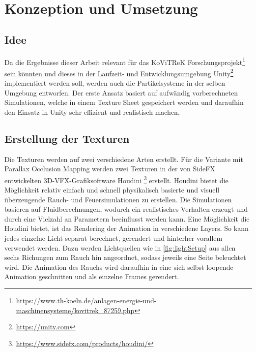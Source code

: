 \section{Konzeption und Umsetzung}
\label{sec:4}
\subsection{Idee}

Da die Ergebnisse dieser Arbeit relevant für das KoViTReK Forschungsprojekt\footnote{\url{https://www.th-koeln.de/anlagen-energie-und-maschinensysteme/kovitrek\_87259.php}}
sein könnten und dieses in der Laufzeit- und Entwicklungsumgebung Unity\footnote{\url{https://unity.com}}
implementiert werden soll, werden auch die Partikelsysteme in der selben Umgebung entworfen.
Der erste Ansatz basiert auf aufwändig vorberechneten Simulationen, welche in einem Texture Sheet gespeichert werden und daraufhin den Einsatz in Unity
sehr effizient und realistisch machen. 


\subsection{Erstellung der Texturen}
\label{sec:4.1}


Die Texturen werden auf zwei verschiedene Arten erstellt. Für die Variante mit Parallax Occlusion Mapping werden zwei
Texturen in der von SideFX entwickelten 3D-VFX-Grafiksoftware Houdini \footnote{\url{https://www.sidefx.com/products/houdini/}} erstellt. 
Houdini bietet die Möglichkeit relativ einfach und schnell physikalisch basierte und visuell überzeugende Rauch- und Feuersimulationen zu erstellen. 
Die Simulationen basieren auf Fluidberechnungen, wodurch ein realistisches Verhalten erzeugt und durch eine Vielzahl an Parametern beeinflusst werden kann.
Eine Möglichkeit die Houdini bietet, ist das Rendering der Animation in verschiedene Layers. So kann jedes einzelne Licht separat berechnet, gerendert und 
hinterher vorallem verwendet werden. Dazu werden Lichtquellen wie in \autoref{fig:lightSetup} aus allen sechs Richungen zum Rauch hin angeordnet, 
sodass jeweils eine Seite beleuchtet wird. Die Animation des Rauchs wird daraufhin in eine sich selbst loopende Animation geschnitten und als einzelne Frames gerendert.

